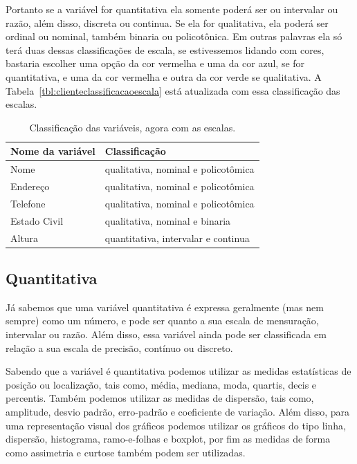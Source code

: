 Portanto se a variável for quantitativa ela somente poderá ser ou intervalar ou razão, além disso, discreta ou continua. Se ela for qualitativa, ela poderá ser ordinal ou nominal, também  binaria ou policotônica. Em outras palavras ela só terá duas dessas classificações de escala, se estivessemos lidando com cores, bastaria escolher uma opção da cor vermelha e uma da cor azul, se for quantitativa, e uma da cor vermelha e outra da cor verde se qualitativa. A Tabela~\ref{tbl:clienteclassificacaoescala} está atualizada com essa classificação das escalas.

\begin{table}
	\centering
	\caption{Classificação das variáveis, agora com as escalas.}
	\begin{tabular}{|l|l|}
		\hline
		\textbf{Nome da variável} &\textbf{Classificação} \\
		\hline
		Nome & qualitativa, nominal e policotômica  \\
		\hline
		Endereço & qualitativa, nominal e policotômica  \\
		\hline
		Telefone & qualitativa, nominal e policotômica \\
		\hline
		Estado Civil & qualitativa, nominal e binaria \\
		\hline
		Altura & quantitativa, intervalar e continua \\
		\hline
	\end{tabular}
	\label{tblclienteclassificacaoescala}
\end{table}

\subsection{Quantitativa}

Já sabemos que uma variável quantitativa é expressa geralmente (mas nem sempre) como um número, e pode ser quanto a sua escala de mensuração, intervalar ou razão. Além disso, essa variável ainda pode ser classificada em relação a sua escala de precisão, contínuo ou discreto.

Sabendo que a variável é quantitativa podemos utilizar as medidas estatísticas de posição ou localização, tais como, média, mediana, moda, quartis, decis e percentis. Também podemos utilizar as medidas de dispersão, tais como, amplitude, desvio padrão, erro-padrão e coeficiente de variação. Além disso, para uma representação visual dos gráficos podemos utilizar os gráficos do tipo linha, dispersão, histograma, ramo-e-folhas e boxplot, por fim as medidas de forma como assimetria e curtose também podem ser utilizadas\cite{favero2017manual}.


